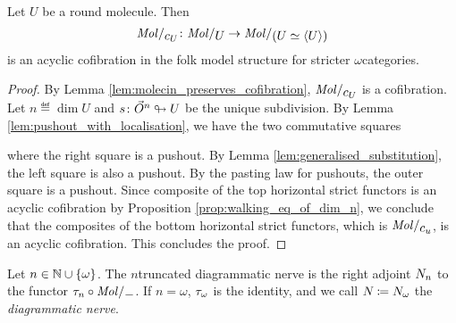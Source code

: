 \begin{prop} \label{prop:molecin_send_Jcomp_to_acof}
    Let \( U \) be a round molecule.
    Then
    \begin{equation*}
        \molecin{c_U} \colon \molecin{U} \to \molecin{(U \simeq \compos{U})}
    \end{equation*}
    is an acyclic cofibration in the folk model structure for stricter \( \omega \)\nbd categories.
\end{prop}
\begin{proof}
    By Lemma \ref{lem:molecin_preserves_cofibration}, \( \molecin{c_U} \) is a cofibration.
    Let \( n \eqdef \dim U \) and \( s \colon \vec{O}^{n} \looparrowright U \) be the unique subdivision.
    By Lemma \ref{lem:pushout_with_localisation}, we have the two commutative squares
    \begin{center}
    \end{center}
    where the right square is a pushout.
    By Lemma \ref{lem:generalised_substitution}, the left square is also a pushout.
    By the pasting law for pushouts, the outer square is a pushout.
    Since composite of the top horizontal strict functors is an acyclic cofibration by Proposition \ref{prop:walking_eq_of_dim_n}, we conclude that the composites of the bottom horizontal strict functors, which is \( \molecin{c_u} \), is an acyclic cofibration.
    This concludes the proof.
\end{proof}


\begin{dfn} 
    Let \( n \in \mathbb{N} \cup \left\{ {\omega} \right\} \). 
    The \( n \)\nbd truncated diagrammatic nerve is the right adjoint \( N_{n} \) to the functor \( \trunc{n} \after \molecin{-} \).
    If \( n = \omega \), \( \tau_{\omega} \) is the identity, and we call \( N_{} \coloneqq N_{\omega} \) the \emph{diagrammatic nerve}.
\end{dfn}

